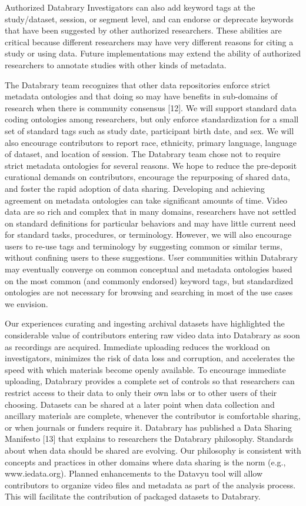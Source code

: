\documentclass[letterpaper,man,natbib]{apa6}
\begin{document}
Authorized Databrary Investigators can also add keyword tags at the study/dataset, session, or segment level, and can endorse or deprecate keywords that have been suggested by other authorized researchers. These
abilities are critical because different researchers may have very different reasons for citing a study or using data. Future implementations may extend the ability of authorized researchers to
annotate studies with other kinds of metadata.

The Databrary team recognizes that other data repositories enforce strict metadata ontologies and that doing so may have benefits in sub-domains of research when there is community consensus [12]. 
We will support standard data coding ontologies among researchers, but only enforce standardization for a small set of standard tags such as study date, participant birth date, and sex. We will also encourage
contributors to report race, ethnicity, primary language, language of
dataset, and location of session. 
The Databrary team chose not to require strict metadata ontologies for several reasons. We hope to
reduce the pre-deposit curational demands on contributors, encourage the repurposing of shared data, and foster the rapid adoption of data sharing. 
Developing and achieving agreement on metadata ontologies can take significant amounts of time. 
Video data are so rich and complex that in many domains, researchers have not settled on standard definitions for particular behaviors and may have little current need for standard tasks, procedures, or terminology. 
However, we will also encourage users to re-use tags and terminology by suggesting common or similar terms, without confining users to these suggestions. 
User communities within Databrary may eventually converge on common conceptual and metadata ontologies based on the most common (and commonly endorsed) keyword tags, but standardized ontologies are not
necessary for browsing and searching in most of the use cases we
envision.

Our experiences curating and ingesting archival datasets have highlighted the considerable value of contributors entering raw video data into Databrary as soon as recordings are acquired. 
Immediate uploading reduces the workload on investigators, minimizes the risk of
data loss and corruption, and accelerates the speed with which materials
become openly available. 
To encourage immediate uploading, Databrary provides a complete set of controls so that researchers can restrict
access to their data to only their own labs or to other users of their
choosing. 
Datasets can be shared at a later point when data collection and ancillary materials are complete, whenever the contributor is comfortable sharing, or when journals or funders require it. 
Databrary has published a Data Sharing Manifesto [13] that explains to researchers the Databrary philosophy. Standards about when data should be shared are evolving. 
Our philosophy is consistent with concepts and practices in other domains where data sharing is the norm (e.g., www.iedata.org).
Planned enhancements to the Datavyu tool will allow contributors to organize video files and metadata as part of the analysis process. 
This will facilitate the contribution of packaged datasets to Databrary.
\end{document}

